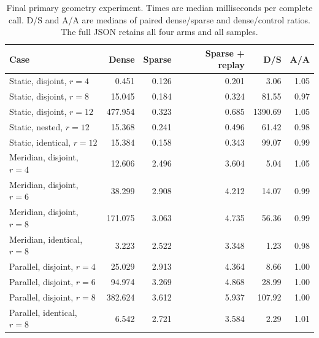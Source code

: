 \begin{table}[htbp]
\centering\small
\setlength{\tabcolsep}{4pt}
\begin{tabular}{@{}lrrrrr@{}}
\toprule
Case & Dense & Sparse & Sparse + replay & D/S & A/A\\
\midrule
Static, disjoint, $r=4$ & 0.451 & 0.126 & 0.201 & 3.06 & 1.05\\
Static, disjoint, $r=8$ & 15.045 & 0.184 & 0.324 & 81.55 & 0.97\\
Static, disjoint, $r=12$ & 477.954 & 0.323 & 0.685 & 1390.69 & 1.05\\
Static, nested, $r=12$ & 15.368 & 0.241 & 0.496 & 61.42 & 0.98\\
Static, identical, $r=12$ & 15.384 & 0.158 & 0.343 & 99.07 & 0.99\\
Meridian, disjoint, $r=4$ & 12.606 & 2.496 & 3.604 & 5.04 & 1.05\\
Meridian, disjoint, $r=6$ & 38.299 & 2.908 & 4.212 & 14.07 & 0.99\\
Meridian, disjoint, $r=8$ & 171.075 & 3.063 & 4.735 & 56.36 & 0.99\\
Meridian, identical, $r=8$ & 3.223 & 2.522 & 3.348 & 1.23 & 0.98\\
Parallel, disjoint, $r=4$ & 25.029 & 2.913 & 4.364 & 8.66 & 1.00\\
Parallel, disjoint, $r=6$ & 94.974 & 3.269 & 4.868 & 28.99 & 1.00\\
Parallel, disjoint, $r=8$ & 382.624 & 3.612 & 5.937 & 107.92 & 1.00\\
Parallel, identical, $r=8$ & 6.542 & 2.721 & 3.584 & 2.29 & 1.01\\
\bottomrule
\end{tabular}
\caption{Final primary geometry experiment. Times are median milliseconds per complete call. D/S and A/A are medians of paired dense/sparse and dense/control ratios. The full JSON retains all four arms and all samples.}
\label{tab:geometry}
\end{table}
